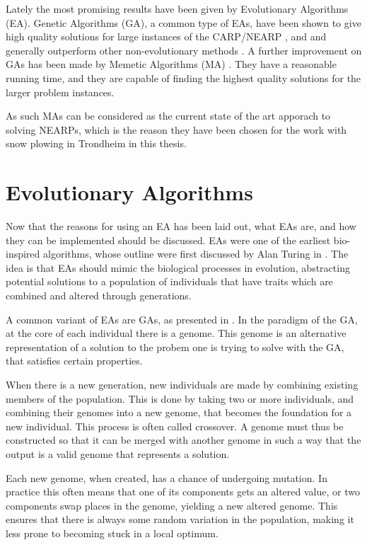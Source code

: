 Lately the most promising results have been given by Evolutionary Algorithms (EA). Genetic Algorithms (GA), a common type of EAs, have been shown to give high quality solutions for large instances of the CARP/NEARP \citep{lacomme2001GA}, and and generally outperform other non-evolutionary methods \citep{wohlk2008decade}. A further improvement on GAs has been made by Memetic Algorithms (MA) \citep{prins2005memeticNEARP}. They have a reasonable running time, and they are capable of finding the highest quality solutions for the larger problem instances.

As such MAs can be considered as the current state of the art apporach to solving NEARPs, which is the reason they have been chosen for the work with snow plowing in Trondheim in this thesis.



\section{Evolutionary Algorithms} %
\label{sec:evolutionary_algorithms}
Now that the reasons for using an EA has been laid out, what EAs are, and how they can be implemented should be discussed. EAs were one of the earliest bio-inspired algorithms, whose outline were first discussed by Alan Turing in \citet{turing1950computing}. The idea is that EAs should mimic the biological processes in evolution, abstracting potential solutions to a population of individuals that have traits which are combined and altered through generations.

A common variant of EAs are GAs, as presented in \citet{holland1975originalGA}. In the paradigm of the GA, at the core of each individual there is a genome. This genome is an alternative representation of a solution to the probem one is trying to solve with the GA, that satisfies certain properties.

When there is a new generation, new individuals are made by combining existing members of the population. This is done by taking two or more individuals, and combining their genomes into a new genome, that becomes the foundation for a new individual. This process is often called crossover. A genome must thus be constructed so that it can be merged with another genome in such a way that the output is a valid genome that represents a solution.

Each new genome, when created, has a chance of undergoing mutation. In practice this often means that one of its components gets an altered value, or two components swap places in the genome, yielding a new altered genome. This ensures that there is always some random variation in the population, making it less prone to becoming stuck in a local optimum.

